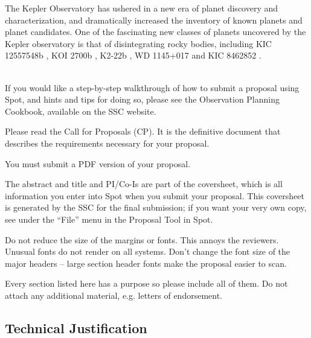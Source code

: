 \documentclass[letterpaper,12pt]{article}
\begin{document}
The Kepler Observatory has ushered in a new era of planet discovery and characterization, and dramatically increased the inventory of known planets and planet candidates.
One of the fascinating new classes of planets uncovered by the Kepler observatory is that of disintegrating rocky bodies,
including KIC 12557548b \citep{rappaport}, KOI 2700b \citep{rappaport2014KOI2700}, K2-22b \citep{sanchis-ojedak2-22}, WD 1145+017 \citep{vanderburg2015wdDisintegrating} and KIC 8462852 \citep{boyajian846}.


\\
If you would like a step-by-step walkthrough of how to submit a
proposal using Spot, and hints and tips for doing so, please see
the Observation Planning Cookbook, available on the SSC website.\newline

Please read the Call for Proposals (CP). It is
the definitive document that describes the requirements
necessary for your proposal. \newline 

You must submit a PDF version of your proposal. \newline

  The abstract and title and PI/Co-Is are part of
the coversheet, which is all information you enter into Spot
when you submit your proposal.  This coversheet is generated by
the SSC for the final submission; if you want your very own
copy, see under the ``File'' menu in the Proposal Tool in Spot.\newline

Do not reduce the size of the margins or fonts.  This annoys the reviewers.
Unusual fonts do not render on all systems.  Don't change the
font size of the major headers --  large section header
fonts make the proposal easier to scan. \newline

Every section listed here has a purpose so please include all of them.
Do not attach any additional material, e.g. letters of endorsement.



\subsection{Technical Justification}
\end{document}
